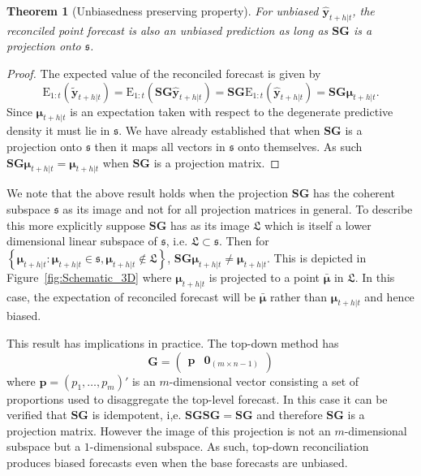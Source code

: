 \documentclass[12pt]{article}
\def\E{\text{E}}
\newtheorem{theo}{Theorem}[section]
\theoremstyle{definition}
\begin{document}
	\begin{theo}[Unbiasedness preserving property]
		For unbiased $\hat{\bm{y}}_{t+h|t}$, the reconciled point forecast is also an unbiased prediction as long as $\bm{SG}$ is a projection onto $\mathfrak{s}$.
	\end{theo}
	\begin{proof}
		The expected value of the reconciled forecast is given by
		\[
		\E_{1:t}(\tilde{\bm{y}}_{t+h|t})
		= \E_{1:t}(\bm{S}\bm{G}\hat{\bm{y}}_{t+h|t})
		= \bm{S}\bm{G}\E_{1:t}(\hat{\bm{y}}_{t+h|t})
		= \bm{S}\bm{G}\bm{\mu}_{t+h|t}.
		\]
		Since $\bm{\mu}_{t+h|t}$ is an expectation taken with respect to the degenerate predictive density it must lie in $\mathfrak{s}$. We have already established that when $\bm{S}\bm{G}$ is a projection onto $\mathfrak{s}$ then it maps all vectors in $\mathfrak{s}$ onto themselves. As such $\bm{S}\bm{G}\bm{\mu}_{t+h|t}=\bm{\mu}_{t+h|t}$ when $\bm{S}\bm{G}$ is a projection matrix.
	\end{proof}

	We note that the above result holds when the projection $\bm{SG}$ has the coherent subspace $\mathfrak{s}$ as its image and not for all projection matrices in general. To describe this more explicitly suppose $\bm{SG}$ has as its image  $\mathfrak{L}$ which is itself a lower dimensional linear subspace of $\mathfrak{s}$, i.e. $\mathfrak{L}\subset\mathfrak{s}$. Then for $\left\{\bm{\mu}_{t+h|t}:\bm{\mu}_{t+h|t}\in\mathfrak{s},\bm{\mu}_{t+h|t}\notin\mathfrak{L}\right\}$,  $\bm{S}\bm{G}\bm{\mu}_{t+h|t} \ne \bm{\mu}_{t+h|t}$. This is depicted in Figure~\ref{fig:Schematic_3D} where $\bm{\mu}_{t+h|t}$ is projected to a point $\bar{\bm{\mu}}$ in $\mathfrak{L}$.  In this case, the expectation of reconciled forecast will be $\bar{\bm{\mu}}$ rather than $\bm{\mu}_{t+h|t}$ and hence biased.
	
    This result has implications in practice. The top-down method \citep{Gross1990} has
	\begin{equation*}
	\bm{G}=\begin{pmatrix}
	\bm{p} & \bm{0}_{(m \times n-1)}
	\end{pmatrix}
	\end{equation*}
    where $\bm{p} = (p_1,\dots,p_m)'$ is an $m$-dimensional vector consisting a set of proportions used to disaggregate the top-level forecast.  In this case it can be verified that $\bm{SG}$ is idempotent, i,e. $\bm{SGSG}=\bm{SG}$ and therefore $\bm{SG}$ is a projection matrix.  However the image of this projection is not an $m$-dimensional subspace but a $1$-dimensional subspace.  As such, top-down reconciliation produces biased forecasts even when the base forecasts are unbiased.
		
\end{document}
